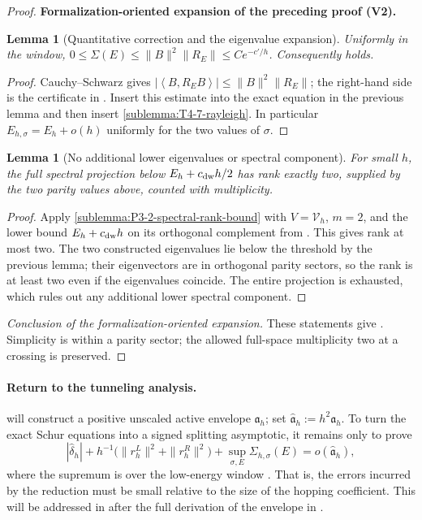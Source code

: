 \documentclass[11pt]{article}
\newtheorem{lemma}[theorem]{Lemma}
\newcommand{\formalisationparentid}{X}
\newenvironment{formalisationaddition}[1]{\par\medskip\begingroup\color{blue}\def\formalisationparentid{#1}\setcounter{formalizationsublemma}{0}\let\lemma\formalizationsublemma\let\endlemma\endformalizationsublemma
  \def\Eo{\mathcal E_h^\circ}\def\EE{\mathcal E_h}\def\phio{\phi_h^\circ}\def\phih{\phi_h}\def\Ho{H_h^{\rm atom}(v^\circ)}\def\Ha{H_h^{\rm atom}}\def\HL{H_h^{L}}\def\Dh{D_h}\def\Log{\operatorname{Log}}\def\ellh{\ell_h}\def\Gp{G_{p,h}}\def\Ast{A_{*,h}}\def\ahat{\widehat{\mathfrak a}_h}\def\ah{\mathfrak a_h}\def\rh{\widehat\rho_h}\def\deltah{\widehat\delta_h}\def\oldref##1{\textup{(##1)}}\def\interface##1{\par\noindent\textit{Analytical interface used here.} ##1\par}\def\finish{\par\noindent\textit{Conclusion of the formalization-oriented expansion.} }\par\noindent\textbf{Formalization-oriented expansion of the preceding proof (V2).}\par\smallskip
}{\par\endgroup\medskip
}
\newcommand{\ip}[2]{\left\langle #1,#2\right\rangle}
\begin{document}
\begin{proof}
\begin{formalisationaddition}{T4.7}
\begin{lemma}[Quantitative correction and the eigenvalue expansion]\label{sublemma:T4-7-correction-expansion}
Uniformly in the window,
$0\le\Sigma(E)\le\|B\|^2\|R_E\|\le Ce^{-c'/h}$.
Consequently  holds.
\end{lemma}
\begin{proof}
Cauchy--Schwarz gives $|\ip B{R_EB}|\le\|B\|^2\|R_E\|$;
the right-hand side is the certificate in .
Insert this estimate into the exact equation in the previous lemma and
then insert \ref{sublemma:T4-7-rayleigh}. In particular
$E_{h,\sigma}=E_h+o(h)$ uniformly for the two values of $\sigma$.
\end{proof}

\begin{lemma}[No additional lower eigenvalues or spectral component]\label{sublemma:T4-7-lowest-two}
For small $h$, the full spectral projection below
$E_h+c_{\rm dw}h/2$ has rank exactly two, supplied by the two parity
values above, counted with multiplicity.
\end{lemma}
\begin{proof}
Apply \ref{sublemma:P3-2-spectral-rank-bound} with
$V=\mathcal V_h$, $m=2$, and the lower bound
$E_h+c_{\rm dw}h$ on its orthogonal complement from
. This gives rank at most two.
The two constructed eigenvalues lie below the threshold by the previous
lemma; their eigenvectors are in orthogonal parity sectors, so the rank
is at least two even if the eigenvalues coincide. The entire projection
is exhausted, which rules out any additional lower spectral component.
\end{proof}
\finish These statements give .
Simplicity is within a parity sector; the allowed full-space multiplicity
two at a crossing is preserved.
\end{formalisationaddition}

\end{proof}

\paragraph{Return to the tunneling analysis.}
 will construct a positive unscaled active
envelope $\mathfrak a_h$; set
$\widehat{\mathfrak a}_h:=h^2\mathfrak a_h$.  
To turn the exact Schur equations
into a signed splitting asymptotic, it remains only to prove
\begin{equation}\label{eq:schur-sharp-interface}
 |\widehat\delta_h|
 +h^{-1}\bigl(\|r_h^L\|^2+\|r_h^R\|^2\bigr)
 +\sup_{\sigma,E}\Sigma_{h,\sigma}(E)
 =o(\widehat{\mathfrak a}_h),
\end{equation}
where the supremum is over the low-energy window
. That is, the errors incurred by the reduction must be small relative to the size of the hopping coefficient. This will be addressed in  after the full derivation of the envelope in .
\end{document}
